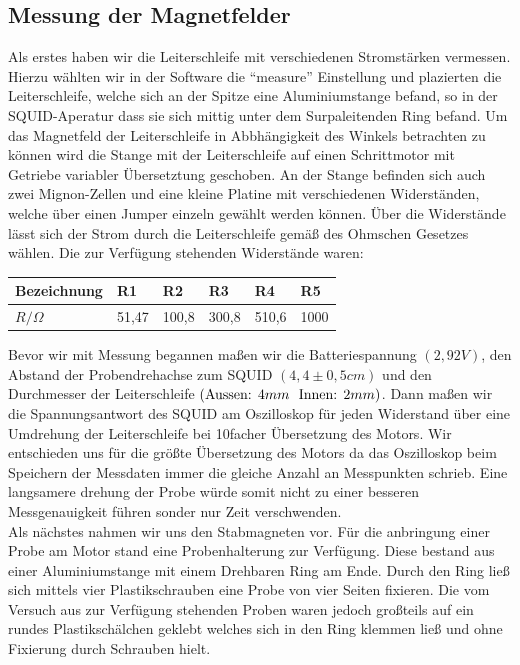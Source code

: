 \documentclass[12pt]{article}
\begin{document}
\subsection{Messung der Magnetfelder}
Als erstes haben wir die Leiterschleife mit verschiedenen Stromstärken vermessen.
Hierzu wählten wir in der Software die "`measure"' Einstellung und plazierten die Leiterschleife, welche sich an der Spitze eine Aluminiumstange befand, so in der SQUID-Aperatur dass sie sich mittig unter dem Surpaleitenden Ring befand. Um das Magnetfeld der Leiterschleife in Abbhängigkeit des Winkels betrachten zu können wird die Stange mit der Leiterschleife auf einen Schrittmotor mit Getriebe variabler Übersetztung geschoben. An der Stange befinden sich auch zwei Mignon-Zellen und eine kleine Platine mit verschiedenen Widerständen, welche über einen Jumper einzeln gewählt werden können. Über die Widerstände lässt sich der Strom durch die Leiterschleife gemäß des Ohmschen Gesetzes wählen. Die zur Verfügung stehenden Widerstände waren:
\begin{center}
\begin{tabular}{|l|lllll|}
\hline 
Bezeichnung & R1 & R2 & R3 & R4 & R5\\
\hline 
$R / \Omega$ & 51,47 & 100,8 & 300,8 & 510,6 & 1000\\
\hline 
\end{tabular}
\end{center}
Bevor wir mit Messung begannen maßen wir die Batteriespannung $(2,92V)$, den Abstand der Probendrehachse zum SQUID $(4,4 \pm 0,5 cm)$ und den Durchmesser der Leiterschleife $(\textnormal{Aussen: }4mm~\textnormal{ Innen: }2mm)$. Dann maßen wir die Spannungsantwort des SQUID am Oszilloskop für jeden Widerstand über eine Umdrehung der Leiterschleife bei 10facher Übersetzung des Motors. Wir entschieden uns für die größte Übersetzung des Motors da das Oszilloskop beim Speichern der Messdaten immer die gleiche Anzahl an Messpunkten schrieb. Eine langsamere drehung der Probe würde somit nicht zu einer besseren Messgenauigkeit führen sonder nur Zeit verschwenden.\\

Als nächstes nahmen wir uns den Stabmagneten vor. Für die anbringung einer Probe am Motor stand eine Probenhalterung zur Verfügung. Diese bestand aus einer Aluminiumstange mit einem Drehbaren Ring am Ende. Durch den Ring ließ sich mittels vier Plastikschrauben eine Probe von vier Seiten fixieren. Die vom Versuch aus zur Verfügung stehenden Proben waren jedoch großteils auf ein rundes Plastikschälchen geklebt welches sich in den Ring klemmen ließ und ohne Fixierung durch Schrauben hielt.
\end{document}
